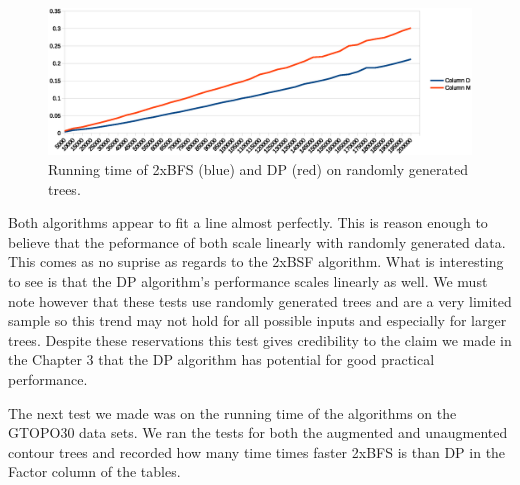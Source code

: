 \begin{figure}[h]%
    \centering
    \includegraphics[center, scale=0.6 ]{./images/running-time-new.eps}
    \caption{Running time of 2xBFS (blue) and DP (red) on randomly generated trees. }%
    \label{fig:running-time-dp-2xbfs}%
\end{figure}

Both algorithms appear to fit a line almost perfectly. This is reason enough to believe that the peformance of both scale linearly with randomly generated data. This comes as no suprise as regards to the 2xBSF algorithm. What is interesting to see is that the DP algorithm's performance scales linearly as well. We must note however that these tests use randomly generated trees and are a very limited sample so this trend may not hold for all possible inputs and especially for larger trees. Despite these reservations this test gives credibility to the claim we made in the Chapter 3 that the DP algorithm has potential for good practical performance.


The next test we made was on the running time of the algorithms on the GTOPO30 data sets. We ran the tests for both the augmented and unaugmented contour trees and recorded how many time times faster 2xBFS is than DP in the Factor column of the tables.


